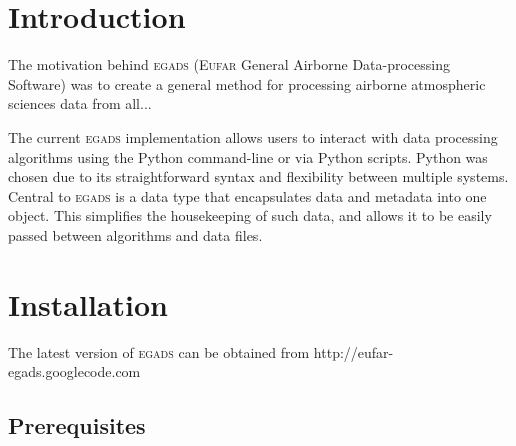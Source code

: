 \documentclass[a4paper,11pt]{report}
\newcommand{\egads}{\textsc{egads} }
\begin{document}
\renewcommand{\thepage}{\roman{page}}






\tableofcontents
\pagebreak


\renewcommand{\thepage}{\arabic{page}}
\setcounter{page}{1}

\chapter{Introduction}

The motivation behind \egads (\textsc{Eufar} General Airborne Data-processing Software) was to create a general method for processing airborne atmospheric sciences data from all...

The current \egads implementation allows users to interact with data processing algorithms using the Python command-line or via Python scripts. Python was chosen due to its straightforward syntax and flexibility between multiple systems. Central to \egads is a data type that encapsulates data and metadata into one object. This simplifies the housekeeping of such data, and allows it to be easily passed between algorithms and data files.



\chapter{Installation}

The latest version of \egads can be obtained from http://eufar-egads.googlecode.com

\section{Prerequisites}
\end{document}
